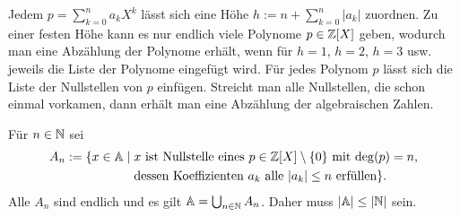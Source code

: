 \begin{Beweis}[Beweis 2]
Jedem $p=\sum_{k=0}^n a_kX^k$ lässt sich eine Höhe
$h:=n+\sum_{k=0}^n |a_k|$ zuordnen. Zu einer festen Höhe kann es nur
endlich viele Polynome $p\in\mathbb Z[X]$ geben, wodurch man eine Abzählung der
Polynome erhält, wenn für $h=1$, $h=2$, $h=3$ usw. jeweils die Liste
der Polynome eingefügt wird. Für jedes Polynom $p$ lässt sich die
Liste der Nullstellen von $p$ einfügen. Streicht man alle Nullstellen,
die schon einmal vorkamen, dann erhält man eine Abzählung der
algebraischen Zahlen.\,\qedsymbol
\end{Beweis}

\begin{Beweis}[Beweis 3]
Für $n\in\mathbb N$ sei
\[\begin{split}
A_n := \{x\in\mathbb A\mid \;&\text{$x$ ist Nullstelle eines
$p\in\mathbb Z[X]\setminus\{0\}$ mit $\deg(p)=n$,}\\
& \text{dessen Koeffizienten $a_k$ alle $|a_k|\le n$
erfüllen}\}.
\end{split}\]
Alle $A_n$ sind endlich und es gilt $\mathbb A=\bigcup_{n\in\mathbb N} A_n$.
Daher muss $|\mathbb A|\le |\mathbb N|$ sein.\,\qedsymbol
\end{Beweis}
